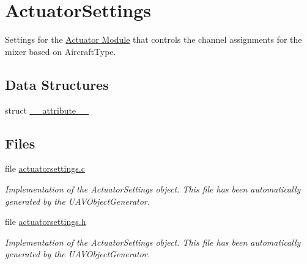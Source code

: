 \hypertarget{group___actuator_settings}{\section{\-Actuator\-Settings}
\label{group___actuator_settings}
}


\-Settings for the \hyperlink{group___actuator_module}{\-Actuator \-Module} that controls the channel assignments for the mixer based on \-Aircraft\-Type.  


\subsection*{\-Data \-Structures}
\begin{DoxyCompactItemize}
\item 
struct \hyperlink{struct____attribute____}{\-\_\-\-\_\-attribute\-\_\-\-\_\-}
\end{DoxyCompactItemize}
\subsection*{\-Files}
\begin{DoxyCompactItemize}
\item 
file \hyperlink{actuatorsettings_8c}{actuatorsettings.\-c}
\begin{DoxyCompactList}\small\item\em \-Implementation of the \-Actuator\-Settings object. \-This file has been automatically generated by the \-U\-A\-V\-Object\-Generator. \end{DoxyCompactList}\item 
file \hyperlink{actuatorsettings_8h}{actuatorsettings.\-h}
\begin{DoxyCompactList}\small\item\em \-Implementation of the \-Actuator\-Settings object. \-This file has been automatically generated by the \-U\-A\-V\-Object\-Generator. \end{DoxyCompactList}\end{DoxyCompactItemize}
